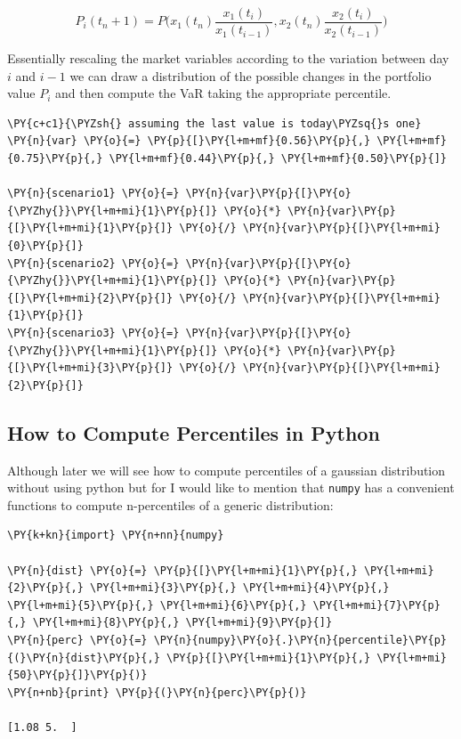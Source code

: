\[P_i(t_n+1) = P\Big(x_1(t_n)\frac{x_1(t_i)}{x_1(t_{i-1})} , x_2(t_n)\frac{x_2(t_i)}{x_2(t_{i-1})}\Big)\]

Essentially rescaling the market variables according to the variation
between day \(i\) and \(i-1\) we can draw a distribution of the possible
changes in the portfolio value \(P_i\) and then compute the VaR taking
the appropriate percentile.

    \begin{tcolorbox}[breakable, size=fbox, boxrule=1pt, pad at break*=1mm,colback=cellbackground, colframe=cellborder]
\begin{Verbatim}[commandchars=\\\{\}]
\PY{c+c1}{\PYZsh{} assuming the last value is today\PYZsq{}s one}
\PY{n}{var} \PY{o}{=} \PY{p}{[}\PY{l+m+mf}{0.56}\PY{p}{,} \PY{l+m+mf}{0.75}\PY{p}{,} \PY{l+m+mf}{0.44}\PY{p}{,} \PY{l+m+mf}{0.50}\PY{p}{]}

\PY{n}{scenario1} \PY{o}{=} \PY{n}{var}\PY{p}{[}\PY{o}{\PYZhy{}}\PY{l+m+mi}{1}\PY{p}{]} \PY{o}{*} \PY{n}{var}\PY{p}{[}\PY{l+m+mi}{1}\PY{p}{]} \PY{o}{/} \PY{n}{var}\PY{p}{[}\PY{l+m+mi}{0}\PY{p}{]}
\PY{n}{scenario2} \PY{o}{=} \PY{n}{var}\PY{p}{[}\PY{o}{\PYZhy{}}\PY{l+m+mi}{1}\PY{p}{]} \PY{o}{*} \PY{n}{var}\PY{p}{[}\PY{l+m+mi}{2}\PY{p}{]} \PY{o}{/} \PY{n}{var}\PY{p}{[}\PY{l+m+mi}{1}\PY{p}{]}
\PY{n}{scenario3} \PY{o}{=} \PY{n}{var}\PY{p}{[}\PY{o}{\PYZhy{}}\PY{l+m+mi}{1}\PY{p}{]} \PY{o}{*} \PY{n}{var}\PY{p}{[}\PY{l+m+mi}{3}\PY{p}{]} \PY{o}{/} \PY{n}{var}\PY{p}{[}\PY{l+m+mi}{2}\PY{p}{]}
\end{Verbatim}
\end{tcolorbox}

\subsection{How to Compute Percentiles in Python}\label{how-to-compute-percentiles-in-python}

Although later we will see how to compute percentiles of a gaussian distribution
without using python but for I would like to mention that \texttt{numpy}
has a convenient functions to compute n-percentiles of a generic
distribution:

    \begin{tcolorbox}[breakable, size=fbox, boxrule=1pt, pad at break*=1mm,colback=cellbackground, colframe=cellborder]
\begin{Verbatim}[commandchars=\\\{\}]
\PY{k+kn}{import} \PY{n+nn}{numpy}

\PY{n}{dist} \PY{o}{=} \PY{p}{[}\PY{l+m+mi}{1}\PY{p}{,} \PY{l+m+mi}{2}\PY{p}{,} \PY{l+m+mi}{3}\PY{p}{,} \PY{l+m+mi}{4}\PY{p}{,} \PY{l+m+mi}{5}\PY{p}{,} \PY{l+m+mi}{6}\PY{p}{,} \PY{l+m+mi}{7}\PY{p}{,} \PY{l+m+mi}{8}\PY{p}{,} \PY{l+m+mi}{9}\PY{p}{]}
\PY{n}{perc} \PY{o}{=} \PY{n}{numpy}\PY{o}{.}\PY{n}{percentile}\PY{p}{(}\PY{n}{dist}\PY{p}{,} \PY{p}{[}\PY{l+m+mi}{1}\PY{p}{,} \PY{l+m+mi}{50}\PY{p}{]}\PY{p}{)}
\PY{n+nb}{print} \PY{p}{(}\PY{n}{perc}\PY{p}{)}

[1.08 5.  ]
    \end{Verbatim}
\end{tcolorbox}

